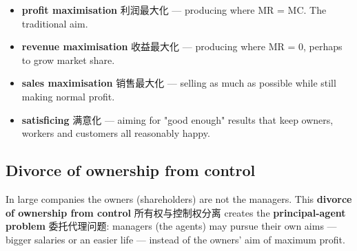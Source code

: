 \documentclass[11pt]{article}
\begin{document}
\begin{itemize}
\item \textbf{profit maximisation} 利润最大化 — producing where MR = MC. The traditional aim.

\item \textbf{revenue maximisation} 收益最大化 — producing where MR = 0, perhaps to grow market share.

\item \textbf{sales maximisation} 销售最大化 — selling as much as possible while still making normal profit.

\item \textbf{satisficing} 满意化 — aiming for "good enough" results that keep owners, workers and customers all reasonably happy.

\end{itemize}

\subsection*{Divorce of ownership from control}

In large companies the owners (shareholders) are not the managers. This \textbf{divorce of ownership from control} 所有权与控制权分离 creates the \textbf{principal-agent problem} 委托代理问题: managers (the agents) may pursue their own aims — bigger salaries or an easier life — instead of the owners' aim of maximum profit.
\end{document}
